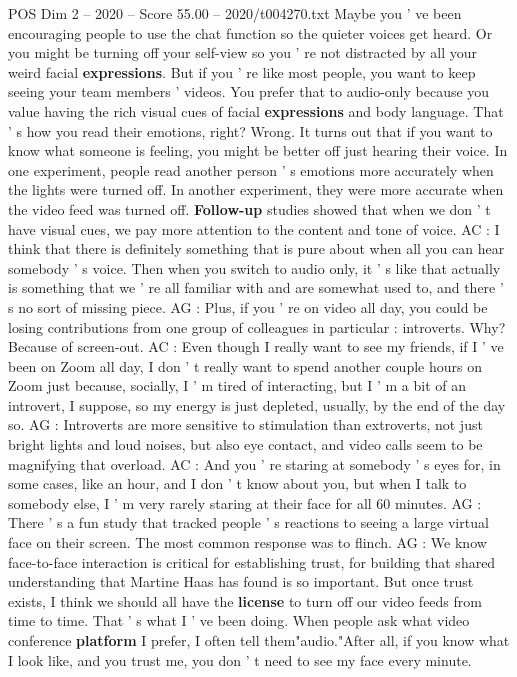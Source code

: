 \begin{textsample}{POS Dim 2 – 2020 – Score 55.00 – 2020/t004270.txt}
Maybe you ' ve been encouraging people to use the chat function so the quieter voices get heard.
Or you might be turning off your self-view so you ' re not distracted by all your weird facial \textbf{expressions}.
But if you ' re like most people, you want to keep seeing your team members ' videos.
You prefer that to audio-only because you value having the rich visual cues of facial \textbf{expressions} and body language.
That ' s how you read their emotions, right?
Wrong.
It turns out that if you want to know what someone is feeling, you might be better off just hearing their voice.
In one experiment, people read another person ' s emotions more accurately when the lights were turned off.
In another experiment, they were more accurate when the video feed was turned off. \textbf{Follow-up} studies showed that when we don ' t have visual cues, we pay more attention to the content and tone of voice.
AC : I think that there is definitely something that is pure about when all you can hear somebody ' s voice.
Then when you switch to audio only, it ' s like that actually is something that we ' re all familiar with and are somewhat used to, and there ' s no sort of missing piece.
AG : Plus, if you ' re on video all day, you could be losing contributions from one group of colleagues in particular : introverts.
Why?
Because of screen-out.
AC : Even though I really want to see my friends, if I ' ve been on Zoom all day, I don ' t really want to spend another couple hours on Zoom just because, socially, I ' m tired of interacting, but I ' m a bit of an introvert, I suppose, so my energy is just depleted, usually, by the end of the day so.
AG : Introverts are more sensitive to stimulation than extroverts, not just bright lights and loud noises, but also eye contact, and video calls seem to be magnifying that overload.
AC : And you ' re staring at somebody ' s eyes for, in some cases, like an hour, and I don ' t know about you, but when I talk to somebody else, I ' m very rarely staring at their face for all 60 minutes.
AG : There ' s a fun study that tracked people ' s reactions to seeing a large virtual face on their screen.
The most common response was to flinch.
AG : We know face-to-face interaction is critical for establishing trust, for building that shared understanding that Martine Haas has found is so important.
But once trust exists, I think we should all have the \textbf{license} to turn off our video feeds from time to time.
That ' s what I ' ve been doing.
When people ask what video conference \textbf{platform} I prefer, I often tell them"audio."After all, if you know what I look like, and you trust me, you don ' t need to see my face every minute.

\end{textsample}
